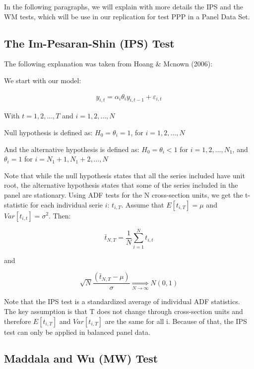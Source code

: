 \documentclass[]{article}
\begin{document}
In the following paragraphs, we will explain with more details the IPS and the WM tests, which will be use in our replication for test PPP in a Panel Data Set.

\hypertarget{the-im-pesaran-shin-ips-test}{%
\subsection{The Im-Pesaran-Shin (IPS) Test}\label{the-im-pesaran-shin-ips-test}}

The following explanation was taken from Hoang \& Mcnown (2006):

We start with our model:

\begin{eqnarray*}
    y_{i,t} =\alpha_{i} \theta_{i} y_{i,t-1} + \varepsilon_{i,t} 
\end{eqnarray*}

With \(t = 1, 2, \dots, T\) and \(i = 1, 2, \dots, N\)

Null hypothesis is defined as: \(H_{0} = \theta_{i} = 1\), for \(i = 1, 2, \dots, N\)

And the alternative hypothesis is defined as: \(H_{0} = \theta_{i} < 1\) for \(i = 1, 2, \dots, N_{1}\), and \(\theta_{i} = 1\) for \(i = N_{1} + 1, N_{1} + 2, \dots, N\)

Note that while the null hypothesis states that all the series included have unit root, the alternative hypothesis states that some of the series included in the panel are stationary.
Using ADF tests for the N cross-section units, we get the t-statistic for each individual serie \(i\): \(t_{i,T}\). Assume that \(E[t_{i,T}] = \mu\) and \(Var[t_{i,t}] = \sigma^2\). Then:

\[\bar{t}_{N,T} = \frac{1}{N} \sum_{i=1}^{N}t_{i,t}\]

and

\[\sqrt{N}\frac{(\bar{t}_{N,T} - \mu)}{\sigma} \underset{N \rightarrow \infty}{\Longrightarrow} N(0,1)\]

Note that the IPS test is a standardized average of individual ADF statistics. The key assumption is that T does not change through cross-section units and therefore \(E[t_{i,T}]\) and \(Var[t_{i,T}]\) are the same for all i. Because of that, the IPS test can only be applied in balanced panel data.

\hypertarget{maddala-and-wu-mw-test}{%
\subsection{Maddala and Wu (MW) Test}\label{maddala-and-wu-mw-test}}
\end{document}
